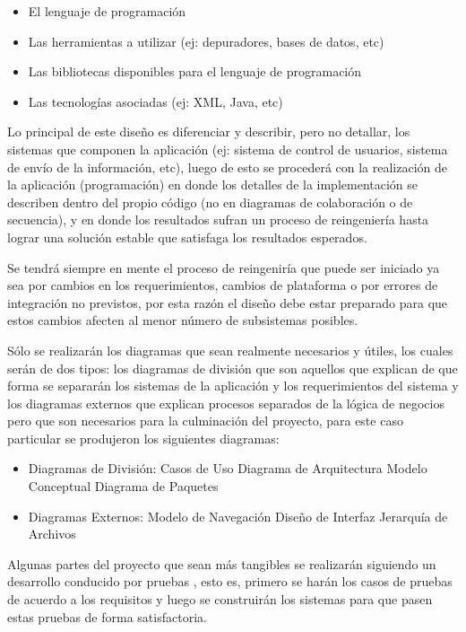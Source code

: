\begin{itemize}
	\item El lenguaje de programación
	\item Las herramientas a utilizar (ej: depuradores, bases de datos, etc)
	\item Las bibliotecas disponibles para el lenguaje de programación
	\item Las tecnologías asociadas (ej: XML, Java, etc)
\end{itemize}

Lo principal de este diseño es diferenciar y describir, pero no detallar, los sistemas que componen la aplicación (ej: sistema de control de usuarios, sistema de envío de la información, etc), luego de esto se procederá con la realización de la aplicación (programación) en donde los detalles de la implementación se describen dentro del propio código (no en diagramas de colaboración o de secuencia), y en donde los resultados sufran un proceso de reingeniería hasta lograr una solución estable que satisfaga los resultados esperados.

Se tendrá siempre en mente el proceso de reingeniría que puede ser iniciado ya sea por cambios en los requerimientos, cambios de plataforma o por errores de integración no previstos, por esta razón el diseño debe estar preparado para que estos cambios afecten al menor número de subsistemas posibles.

Sólo se realizarán los diagramas que sean realmente necesarios y útiles, los cuales serán de dos tipos: los diagramas de división que son aquellos que explican de que forma se separarán los sistemas de la aplicación y los requerimientos del sistema y los diagramas externos que explican procesos separados de la lógica de negocios pero que son necesarios para la culminación del proyecto, para este caso particular se produjeron los siguientes diagramas:

\begin{itemize}
	
	\item Diagramas de División:
	\subitem Casos de Uso
	\subitem Diagrama de Arquitectura
	\subitem Modelo Conceptual
	\subitem Diagrama de Paquetes
	
	\item Diagramas Externos:
	\subitem Modelo de Navegación
	\subitem Diseño de Interfaz
	\subitem Jerarquía de Archivos
	
\end{itemize}

Algunas partes del proyecto que sean más tangibles se realizarán siguiendo un desarrollo conducido por pruebas \cite{tdd}, esto es, primero se harán los casos de pruebas de acuerdo a los requisitos y luego se construirán los sistemas para que pasen estas pruebas de forma satisfactoria.


